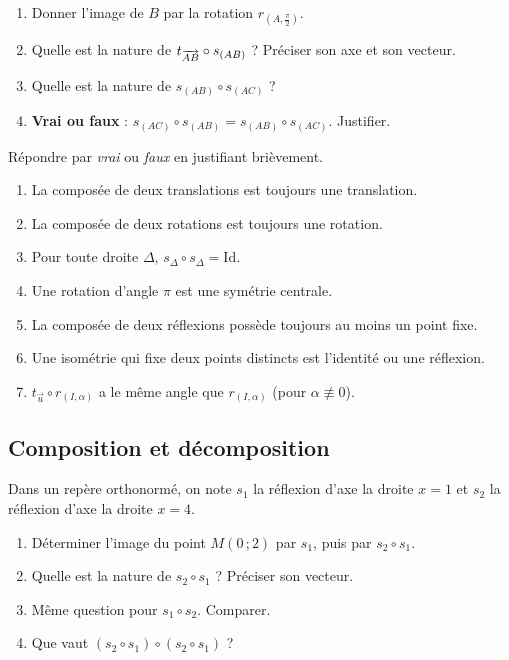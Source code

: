 \begin{center}
\end{center}

\begin{enumerate}
	\item Donner l'image de $B$ par la rotation $r_{\left(A,\frac{\pi}{2}\right)}$.
	\item Quelle est la nature de $t_{\overrightarrow{AB}}\circ s_{(AB)}$ ? Préciser son
	axe et son vecteur.
	\item Quelle est la nature de $s_{(AB)}\circ s_{(AC)}$ ?
	\item \textbf{Vrai ou faux} : $s_{(AC)}\circ s_{(AB)} = s_{(AB)}\circ s_{(AC)}$.
	Justifier.
\end{enumerate}

Répondre par \emph{vrai} ou \emph{faux} en justifiant brièvement.
\begin{enumerate}
	\item La composée de deux translations est toujours une translation.
	\item La composée de deux rotations est toujours une rotation.
	\item Pour toute droite $\Delta$, $s_\Delta\circ s_\Delta = \mathrm{Id}$.
	\item Une rotation d'angle $\pi$ est une symétrie centrale.
	\item La composée de deux réflexions possède toujours au moins un point
	fixe.
	\item Une isométrie qui fixe deux points distincts est l'identité ou une
	réflexion.
	\item $t_{\vec u}\circ r_{(I,\alpha)}$ a le même angle que $r_{(I,\alpha)}$
	(pour $\alpha\not\equiv 0$).
\end{enumerate}

\subsection{Composition et décomposition}

Dans un repère orthonormé, on note $s_1$ la réflexion d'axe la droite
$x=1$ et $s_2$ la réflexion d'axe la droite $x=4$.
\begin{enumerate}
	\item Déterminer l'image du point $M(0\,;2)$ par $s_1$, puis par
	$s_2\circ s_1$.
	\item Quelle est la nature de $s_2\circ s_1$ ? Préciser son vecteur.
	\item Même question pour $s_1\circ s_2$. Comparer.
	\item Que vaut $(s_2\circ s_1)\circ(s_2\circ s_1)$ ?
\end{enumerate}

